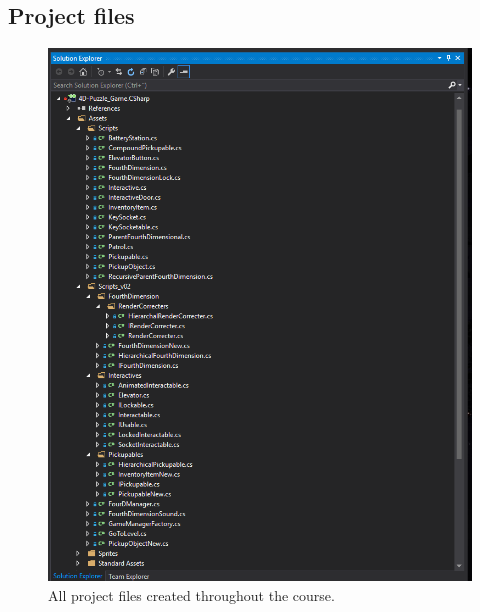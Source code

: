 \subsection{Project files}
\begin{figure}[h!]
	\centering
	\includegraphics[scale=0.7]{pictures/FileOverview.png}
	\caption{All project files created throughout the course.}
	\label{projectFiles}
\end{figure}

\pagebreak
